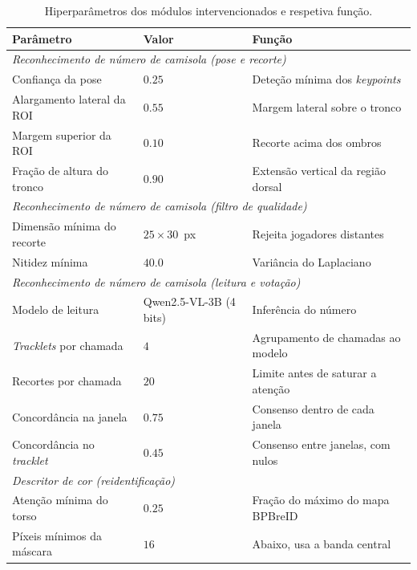 \begin{table}[htbp]
    \centering
    \caption{Hiperparâmetros dos módulos intervencionados e respetiva função.}
    \label{tab:hiperparametros}
    \begin{tabular}{lll}
        \hline
        \textbf{Parâmetro} & \textbf{Valor} & \textbf{Função} \\
        \hline
        \multicolumn{3}{l}{\emph{Reconhecimento de número de camisola (pose e recorte)}} \\
        Confiança da pose            & $0.25$          & Deteção mínima dos \emph{keypoints} \\
        Alargamento lateral da ROI   & $0.55$          & Margem lateral sobre o tronco \\
        Margem superior da ROI       & $0.10$          & Recorte acima dos ombros \\
        Fração de altura do tronco   & $0.90$          & Extensão vertical da região dorsal \\
        \hline
        \multicolumn{3}{l}{\emph{Reconhecimento de número de camisola (filtro de qualidade)}} \\
        Dimensão mínima do recorte   & $25\times30$~px & Rejeita jogadores distantes \\
        Nitidez mínima               & $40.0$          & Variância do Laplaciano \\
        \hline
        \multicolumn{3}{l}{\emph{Reconhecimento de número de camisola (leitura e votação)}} \\
        Modelo de leitura            & Qwen2.5-VL-3B (4 bits) & Inferência do número \\
        \emph{Tracklets} por chamada & $4$             & Agrupamento de chamadas ao modelo \\
        Recortes por chamada         & $20$            & Limite antes de saturar a atenção \\
        Concordância na janela       & $0.75$          & Consenso dentro de cada janela \\
        Concordância no \emph{tracklet} & $0.45$       & Consenso entre janelas, com nulos \\
        \hline
        \multicolumn{3}{l}{\emph{Descritor de cor (reidentificação)}} \\
        Atenção mínima do torso      & $0.25$          & Fração do máximo do mapa BPBreID \\
        Píxeis mínimos da máscara    & $16$            & Abaixo, usa a banda central \\

\end{tabular}
\end{table}
